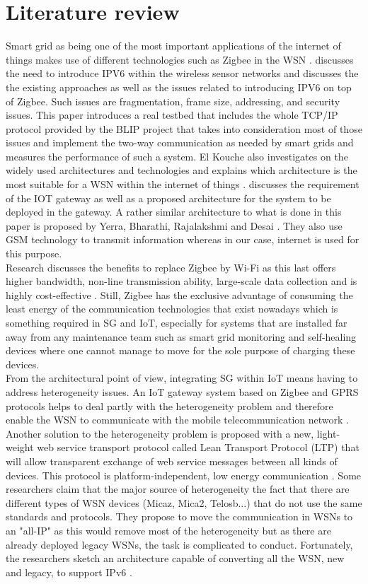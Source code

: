 \documentclass[conference]{IEEEtran}
\begin{document}
\section{Literature review}
Smart grid as being one of the most important applications of the internet of things makes use of different technologies such as Zigbee in the WSN \cite{ref1}.  \cite{ref2} discusses the need to introduce IPV6 within the wireless sensor networks and discusses the the existing approaches as well as the issues related to introducing IPV6 on top of Zigbee. Such issues are fragmentation, frame size, addressing, and security issues. This paper introduces a real testbed that includes the whole TCP/IP protocol provided by the BLIP project that takes into consideration most of those issues and implement the two-way communication as needed by smart grids and measures the performance of such a system. El Kouche also investigates on the widely used architectures and technologies and explains which architecture is the most suitable for a WSN within the internet of things \cite{ref3}. \cite{ref4} discusses the requirement of the IOT gateway as well as a proposed architecture for the system to be deployed in the gateway. A rather similar architecture to what is done in this paper is proposed by Yerra, Bharathi, Rajalakshmi and Desai \cite{ref7}. They also use GSM technology to transmit information whereas in our case, internet is used for this purpose. \\
Research discusses the benefits to replace Zigbee by Wi-Fi as this last offers higher bandwidth, non-line transmission ability, large-scale data collection and is highly cost-effective \cite{ref11}. Still, Zigbee has the exclusive advantage of consuming the least energy of the communication technologies that exist nowadays which is something required in SG and IoT, especially for systems that are installed far away from any maintenance team such as smart grid monitoring and self-healing devices where one cannot manage to move for the sole purpose of charging these devices.  \\
From the architectural point of view, integrating SG within IoT means having to address heterogeneity issues. An IoT gateway system based on Zigbee and GPRS protocols helps to deal partly with the heterogeneity problem and therefore enable the WSN to communicate with the mobile telecommunication network \cite{ref11}. Another solution to the heterogeneity problem is proposed with a new, light-weight web service transport protocol called Lean Transport Protocol (LTP) that will allow transparent exchange of web service messages between all kinds of devices. This protocol is platform-independent, low energy communication \cite{ref12}. Some researchers claim that the major source of heterogeneity the fact that there are different types of WSN devices (Micaz, Mica2, Telosb...) that do not use the same standards and protocols. They propose to move the communication in WSNs to an "all-IP" as this would remove most of the heterogeneity but as there are already deployed legacy WSNs, the task is complicated to conduct. Fortunately, the researchers sketch an architecture capable of converting all the WSN, new and legacy, to support IPv6 \cite{ref13}.
\end{document}
